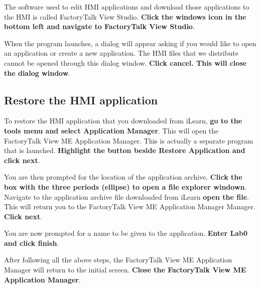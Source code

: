 The software used to edit HMI applications and download those applications to the HMI is called FactoryTalk View Studio. \textbf{Click the windows icon in the bottom left and navigate to FactoryTalk View Studio}. 

When the program launches, a dialog will appear asking if you would like to open an application or create a new application. The HMI files that we distribute cannot be opened through this dialog window. \textbf{Click cancel. This will close the dialog window}. 


\subsection{Restore the HMI application}

To restore the HMI application that you downloaded from iLearn, \textbf{go to the tools menu and select Application Manager}. This will open the FactoryTalk View ME Application Manager. This is actually a separate program that is launched. \textbf{Highlight the button beside Restore Application and click next}. 

You are then prompted for the location of the application archive. \textbf{Click the box with the three periods (ellipse) to open a file explorer windown}. Navigate to the application archive file downloaded from iLearn \textbf{open the file}. This will return you to the FactoryTalk View ME Application Manager Manager. \textbf{Click next}.

You are now prompted for a name to be given to the application. \textbf{Enter Lab0 and click finish}. 



After following all the above steps, the FactoryTalk View ME Application Manager will return to the initial screen. \textbf{Close the FactoryTalk View ME Application Manager}.

